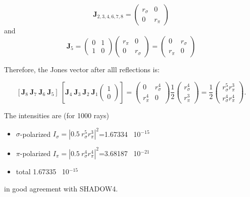 \documentclass{iucr}
\begin{document}
\begin{equation}\label{eq:Jcase1}
\textbf{J}_{2,3,4,6,7,8}=
    \begin{pmatrix}
r_\sigma & 0\\
0& 
r_\pi
\end{pmatrix}
\end{equation}
and
\begin{equation}\label{eq:J5case1}
\textbf{J}_{5}=
\begin{pmatrix}
0 & 1\\
1 & 0
\end{pmatrix}
\begin{pmatrix}
r_\pi & 0\\
0& 
r_\sigma
\end{pmatrix}=
\begin{pmatrix}
0 & r_\sigma\\
r_\pi& 
0
\end{pmatrix}
\end{equation}



Therefore, the Jones vector after alll reflections is:

\begin{equation}\label{eq:JVcase1}
[\textbf{J}_8~\textbf{J}_7~\textbf{J}_6~\textbf{J}_5]~[\textbf{J}_4~\textbf{J}_3~\textbf{J}_2~\textbf{J}_1
    \begin{pmatrix}
    1\\0
    \end{pmatrix}]=
    \begin{pmatrix}
    0 & r_\sigma^4\\
    r_\pi^4 & 0
    \end{pmatrix}
    \frac{1}{2}
    \begin{pmatrix}
    r_\sigma^4\\
    r_\pi^3
    \end{pmatrix}
    = 
\frac{1}{2}
    \begin{pmatrix}
    r_\sigma^5 r_\pi^3\\
    r_\sigma^4 r_\pi^4
    \end{pmatrix}.
\end{equation}

The intensities are (for 1000 rays)
\begin{itemize}
    \item $\sigma$-polarized $I_\sigma=|0.5~r_\sigma^5 r_\pi^3|^2$=1.67334~ 10$^{-15}$
    \item $\pi$-polarized $I_\pi=|0.5~r_\sigma^4 r_\pi^4|^2$=3.68187~ 10$^{-21}$
    \item total 1.67335~ 10$^{-15}$
\end{itemize}
in good agreement with SHADOW4.
\end{document}
